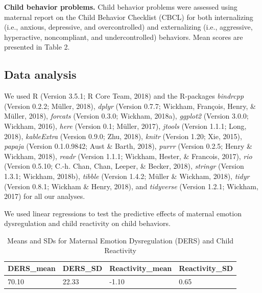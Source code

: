 \documentclass[man]{apa6}
\begin{document}
\textbf{Child behavior problems.} Child behavior problems were assessed
using maternal report on the Child Behavior Checklist (CBCL) for both
internalizing (i.e., anxious, depressive, and overcontrolled) and
externalizing (i.e., aggressive, hyperactive, noncompliant, and
undercontrolled) behaviors. Mean scores are presented in Table 2.

\subsection{Data analysis}\label{data-analysis}

We used R (Version 3.5.1; R Core Team, 2018) and the R-packages
\emph{bindrcpp} (Version 0.2.2; Müller, 2018), \emph{dplyr} (Version
0.7.7; Wickham, François, Henry, \& Müller, 2018), \emph{forcats}
(Version 0.3.0; Wickham, 2018a), \emph{ggplot2} (Version 3.0.0; Wickham,
2016), \emph{here} (Version 0.1; Müller, 2017), \emph{jtools} (Version
1.1.1; Long, 2018), \emph{kableExtra} (Version 0.9.0; Zhu, 2018),
\emph{knitr} (Version 1.20; Xie, 2015), \emph{papaja} (Version
0.1.0.9842; Aust \& Barth, 2018), \emph{purrr} (Version 0.2.5; Henry \&
Wickham, 2018), \emph{readr} (Version 1.1.1; Wickham, Hester, \&
Francois, 2017), \emph{rio} (Version 0.5.10; C.-h. Chan, Chan, Leeper,
\& Becker, 2018), \emph{stringr} (Version 1.3.1; Wickham, 2018b),
\emph{tibble} (Version 1.4.2; Müller \& Wickham, 2018), \emph{tidyr}
(Version 0.8.1; Wickham \& Henry, 2018), and \emph{tidyverse} (Version
1.2.1; Wickham, 2017) for all our analyses.

We used linear regressions to test the predictive effects of maternal
emotion dysregulation and child reactivity on child behaviors.

\begin{table}[tbp]
\begin{center}
\begin{threeparttable}
\caption{\label{tab:descriptives ders and reactivity}Means and SDs for Maternal Emotion Dysregulation (DERS) and Child Reactivity}
\begin{tabular}{llll}
\toprule
DERS\_mean & \multicolumn{1}{c}{DERS\_SD} & \multicolumn{1}{c}{Reactivity\_mean} & \multicolumn{1}{c}{Reactivity\_SD}\\
\midrule
70.10 & 22.33 & -1.10 & 0.65\\
\bottomrule
\end{tabular}
\end{threeparttable}
\end{center}
\end{table}
\end{document}
